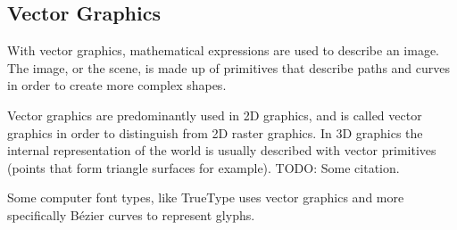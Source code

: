 \subsection{Vector Graphics}
With vector graphics, mathematical expressions are used to describe an image.
The image, or the scene, is made up of primitives that describe paths and curves in order to create more complex shapes.

Vector graphics are predominantly used in 2D graphics, and is called vector graphics in order to distinguish from 2D raster graphics.
In 3D graphics the internal representation of the world is usually described with vector primitives (points that form triangle surfaces for example).
TODO: Some citation.

Some computer font types, like TrueType uses vector graphics and more specifically Bézier curves to represent glyphs\cite{truetype}.
